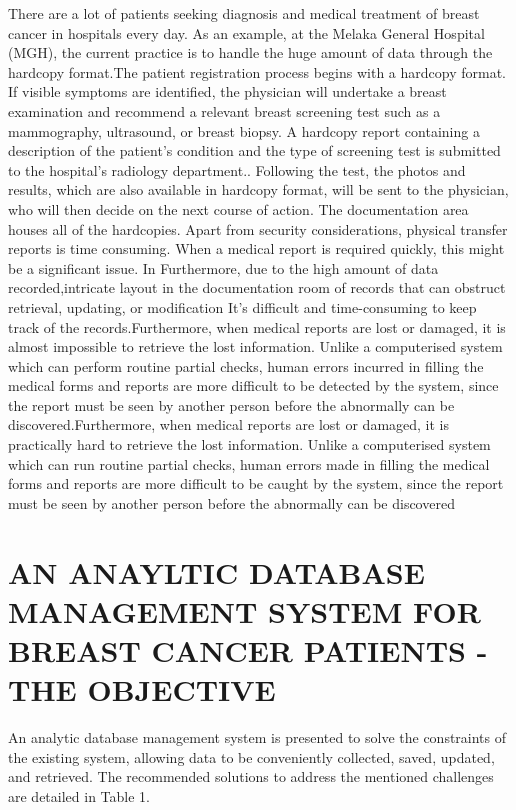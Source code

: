 \documentclass[10pt,a4paper,twoside]{article}
\begin{document}
There are a lot of patients seeking diagnosis and medical
treatment of breast cancer in hospitals every day. As an
example, at the Melaka General Hospital (MGH), the
current practice is to handle the huge amount of data
through the hardcopy format.The patient registration process begins with a hardcopy format. If visible symptoms are identified, the physician will undertake a breast examination and recommend a relevant breast screening test such as a mammography, ultrasound, or breast biopsy. A hardcopy report containing a description of the patient's condition and the type of screening test is submitted to the hospital's radiology department.. Following the test, the photos and results, which are also available in hardcopy format, will be sent to the physician, who will then decide on the next course of action. The documentation area houses all of the hardcopies.
\vspace{0.3cm}
Apart from security considerations, physical transfer  reports is time consuming. When a medical report is required quickly, this might be a significant issue. In Furthermore, due to the high amount of data recorded,intricate layout in the documentation room of records that can obstruct retrieval, updating, or modification It's difficult and time-consuming to keep track of the records.Furthermore, when medical reports are lost or damaged, it is almost impossible to retrieve the lost information.
Unlike a computerised system which can perform routine partial checks, human errors incurred in filling the medical forms and reports are more difficult to be detected by the system, since the report must be seen by another person before the abnormally can be discovered.Furthermore, when medical reports are lost or damaged, it is practically hard to retrieve the lost information.
Unlike a computerised system which can run routine partial checks, human errors made in filling the medical forms and reports are more difficult to be caught by the system, since the report must be seen by another person before the abnormally can be discovered

\section{ AN ANAYLTIC DATABASE MANAGEMENT SYSTEM FOR BREAST
CANCER PATIENTS - THE OBJECTIVE}

An analytic database management system is presented to solve the constraints of the existing system, allowing data to be conveniently collected, saved, updated, and retrieved. The recommended solutions to address the mentioned challenges are detailed in Table 1.
\end{document}
